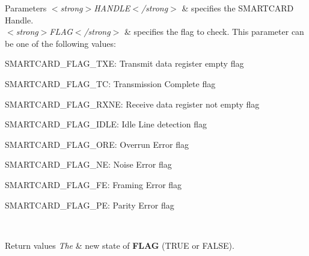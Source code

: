 \begin{DoxyParams}{Parameters}
{\em $<$strong$>$\+H\+A\+N\+D\+L\+E$<$/strong$>$} & specifies the S\+M\+A\+R\+T\+C\+A\+RD Handle. \\
\hline
{\em $<$strong$>$\+F\+L\+A\+G$<$/strong$>$} & specifies the flag to check. This parameter can be one of the following values\+: \begin{DoxyItemize}
\item S\+M\+A\+R\+T\+C\+A\+R\+D\+\_\+\+F\+L\+A\+G\+\_\+\+T\+XE\+: Transmit data register empty flag \item S\+M\+A\+R\+T\+C\+A\+R\+D\+\_\+\+F\+L\+A\+G\+\_\+\+TC\+: Transmission Complete flag \item S\+M\+A\+R\+T\+C\+A\+R\+D\+\_\+\+F\+L\+A\+G\+\_\+\+R\+X\+NE\+: Receive data register not empty flag \item S\+M\+A\+R\+T\+C\+A\+R\+D\+\_\+\+F\+L\+A\+G\+\_\+\+I\+D\+LE\+: Idle Line detection flag \item S\+M\+A\+R\+T\+C\+A\+R\+D\+\_\+\+F\+L\+A\+G\+\_\+\+O\+RE\+: Overrun Error flag \item S\+M\+A\+R\+T\+C\+A\+R\+D\+\_\+\+F\+L\+A\+G\+\_\+\+NE\+: Noise Error flag \item S\+M\+A\+R\+T\+C\+A\+R\+D\+\_\+\+F\+L\+A\+G\+\_\+\+FE\+: Framing Error flag \item S\+M\+A\+R\+T\+C\+A\+R\+D\+\_\+\+F\+L\+A\+G\+\_\+\+PE\+: Parity Error flag \end{DoxyItemize}
\\
\hline
\end{DoxyParams}

\begin{DoxyRetVals}{Return values}
{\em The} & new state of {\bfseries F\+L\+AG} (T\+R\+UE or F\+A\+L\+SE). \\
\hline
\end{DoxyRetVals}
